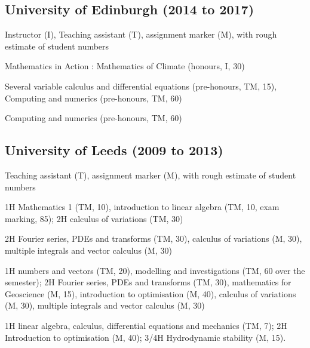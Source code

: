 \documentclass[letterpaper]{article}
\renewenvironment{itemize}{
  \begin{list}{}{
    \setlength{\leftmargin}{1.5em}
  }
}{
  \end{list}
}
\begin{document}
\subsection*{University of Edinburgh (2014 to 2017)}
\begin{itemize}
\item Instructor (I), Teaching assistant (T), assignment marker (M), with rough estimate of
student numbers
\begin{itemize}
  \item[16/17:] Mathematics in Action : Mathematics of Climate (honours, I, 30)
	\item[15/16:] Several variable calculus and differential equations
	(pre-honours, TM, 15), Computing and numerics (pre-honours, TM, 60)
	\item[14/15:] Computing and numerics (pre-honours, TM, 60)
\end{itemize}
\end{itemize}

\subsection*{University of Leeds (2009 to 2013)}
\begin{itemize}
\item Teaching assistant (T), assignment marker (M), with rough estimate of
student numbers
\begin{itemize}
	\item[12/13:] 1H Mathematics 1 (TM, 10), introduction to linear algebra (TM,
	10, exam marking, 85); 2H calculus of variations (TM, 30)
	\item[11/12:] 2H Fourier series, PDEs and transforms (TM, 30), calculus of
	variations (M, 30), multiple integrals and vector calculus (M, 30)
	\item[10/11:] 1H numbers and vectors (TM, 20), modelling and investigations
	(TM, 60 over the semester); 2H Fourier series, PDEs and transforms (TM, 30),
	mathematics for Geoscience (M, 15), introduction to optimisation (M, 40),
	calculus of variations (M, 30), multiple integrals and vector calculus (M,
	30)
	\item[09/10:] 1H linear algebra, calculus, differential equations and
	mechanics (TM, 7); 2H Introduction to optimisation (M, 40); 3/4H
	Hydrodynamic stability (M, 15).
\end{itemize}
\end{itemize}
\end{document}

